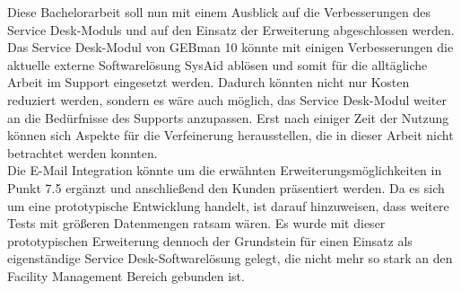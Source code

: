 \noindent
Diese Bachelorarbeit soll nun mit einem Ausblick auf die Verbesserungen des Service Desk-Moduls und auf den Einsatz der Erweiterung abgeschlossen werden. Das Service Desk-Modul von GEBman 10 könnte mit einigen Verbesserungen die aktuelle externe Softwarelösung SysAid ablösen und somit für die alltägliche Arbeit im Support eingesetzt werden. Dadurch könnten nicht nur Kosten reduziert werden, sondern es wäre auch möglich, das Service Desk-Modul weiter an die Bedürfnisse des Supports anzupassen. Erst nach einiger Zeit der Nutzung können sich Aspekte für die Verfeinerung herausstellen, die in dieser Arbeit nicht betrachtet werden konnten.\\

\noindent
Die E-Mail Integration könnte um die erwähnten Erweiterungsmöglichkeiten in Punkt 7.5 ergänzt und anschließend den Kunden präsentiert werden. Da es sich um eine prototypische Entwicklung handelt, ist darauf hinzuweisen, dass weitere Tests mit größeren Datenmengen ratsam wären. Es wurde mit dieser prototypischen Erweiterung dennoch der Grundstein für einen Einsatz als eigenständige Service Desk-Softwarelösung gelegt, die nicht mehr so stark an den Facility Management Bereich gebunden ist.


